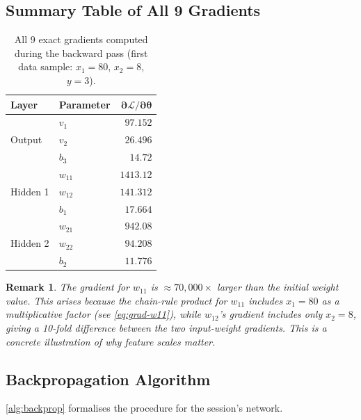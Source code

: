 \documentclass[12pt,a4paper]{article}
\newtheorem{remark}{Remark}[section]
\newcommand{\Loss}{\mathcal{L}}
\begin{document}
\subsection{Summary Table of All 9 Gradients}
\label{sec:grad-table}

\begin{table}[ht]
\centering
\caption{All 9 exact gradients computed during the backward pass
         (first data sample: $x_1=80$, $x_2=8$, $y=3$).}
\label{tab:gradients}
\begin{tabular}{llr}
\toprule
\textbf{Layer} & \textbf{Parameter} & $\boldsymbol{\partial\Loss/\partial\theta}$ \\
\midrule
\multirow{3}{*}{Output}
  & $v_1$  & $97.152$  \\
  & $v_2$  & $26.496$  \\
  & $b_3$  & $14.72$   \\
\midrule
\multirow{3}{*}{Hidden 1}
  & $w_{11}$ & $1413.12$  \\
  & $w_{12}$ & $141.312$  \\
  & $b_1$    & $17.664$   \\
\midrule
\multirow{3}{*}{Hidden 2}
  & $w_{21}$ & $942.08$  \\
  & $w_{22}$ & $94.208$  \\
  & $b_2$    & $11.776$  \\
\bottomrule
\end{tabular}
\end{table}

\begin{remark}
\label{rem:large-grad}
The gradient for $w_{11}$ is $\approx 70{,}000\times$ larger than the
initial weight value.  This arises because the chain-rule product for
$w_{11}$ includes $x_1 = 80$ as a multiplicative factor
(see \cref{eq:grad-w11}), while $w_{12}$'s gradient includes only
$x_2 = 8$, giving a 10-fold difference between the two input-weight
gradients.  This is a concrete illustration of why feature scales
matter.
\end{remark}

\subsection{Backpropagation Algorithm}

\cref{alg:backprop} formalises the procedure for the session's network.
\end{document}
